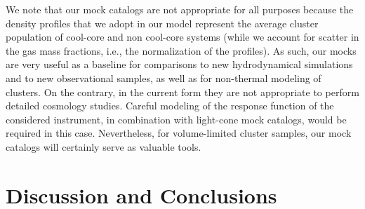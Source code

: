 \documentclass[useAMS,usenatbib]{mn2e}
\begin{document}
{We note that our mock catalogs are not appropriate for all purposes because the
density profiles that we adopt in our model represent the average cluster
population of cool-core and non cool-core systems (while we account for scatter
in the gas mass fractions, i.e., the normalization of the profiles). As such,
our mocks are very useful as a baseline for comparisons to new hydrodynamical
simulations and to new observational samples, as well as for non-thermal
modeling of clusters. On the contrary, in the current form they are not
appropriate to perform detailed cosmology studies. Careful modeling of the
response function of the considered instrument, in combination with light-cone
mock catalogs, would be required in this case. Nevertheless, for volume-limited
cluster samples, our mock catalogs will certainly serve as valuable tools. }


\section{Discussion and Conclusions}
\label{sec:7}
\end{document}
